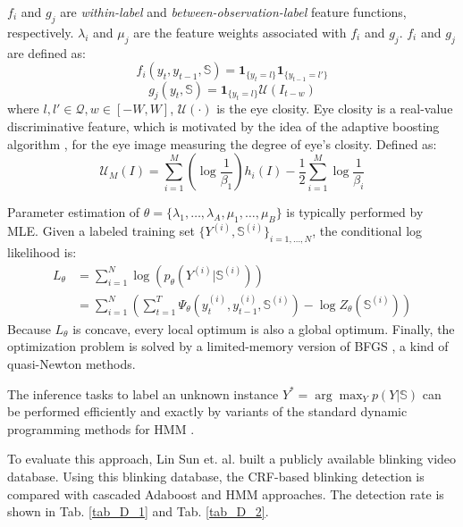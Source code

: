 \documentclass[journal]{IEEEtran}
\begin{document}
$f_i$ and $g_j$ are \textit{within-label} and \textit{between-observation-label} feature functions, respectively. $\lambda_i$ and $\mu_j$ are the feature weights associated with $f_i$ and $g_j$. $f_i$ and $g_j$ are defined as:
\begin{equation}
\label{eq_D_4}
f_i(y_t,y_{t-1},\mathbb{S}) = \mathbf{1}_{\{y_t=l\}} \mathbf{1}_{\{y_{t-1}=l'\}}
\end{equation}
\begin{equation}
\label{eq_D_5}
g_j(y_t,\mathbb{S}) = \mathbf{1}_{\{y_t=l\}} \mathcal{U}(I_{t-w})
\end{equation}
where $l, l' \in \mathcal{Q}, w\in[-W,W]$, $\mathcal{U}(\cdot)$ is the eye closity. Eye closity is a real-value discriminative feature, which is motivated by the idea of the adaptive boosting algorithm \cite{freund1997decision}, for the eye image measuring the degree of eye's closity. Defined as:
\begin{equation}
\label{eq_D_6}
\mathcal{U}_M(I) = \sum_{i=1}^M (\log \frac{1}{\beta_1}) h_i(I) - \frac{1}{2} \sum_{i=1}^M \log \frac{1}{\beta_i}
\end{equation}

Parameter estimation of $\theta=\{\lambda_1,\dots,\lambda_A,\mu_1,\dots,\mu_B\}$ is typically performed by MLE. Given a labeled training set $\{Y^{(i)}, \mathbb{S}^{(i)}\}_{i=1,\dots,N}$, the conditional log likelihood is:
\begin{equation}
\label{eq_D_7}
\begin{aligned}
L_\theta &= \sum_{i=1}^N \log (p_\theta(Y^{(i)}|\mathbb{S}^{(i)})) \\
&= \sum_{i=1}^N (\sum_{t=1}^T \Psi_\theta(y_t^{(i)},y_{t-1}^{(i)},\mathbb{S}^{(i)}) - \log Z_\theta(\mathbb{S}^{(i)}))
\end{aligned}
\end{equation}
Because $L_\theta$ is concave, every local optimum is also a global optimum. Finally, the optimization problem is solved by a limited-memory version of BFGS \cite{sha2003shallow}, a kind of quasi-Newton methods.

The inference tasks to label an unknown instance $Y^* = \arg \max_Y p(Y|\mathbb{S})$ can be performed efficiently and exactly by variants of the standard dynamic programming methods for HMM \cite{rabiner1989tutorial}.

To evaluate this approach, Lin Sun et. al. \cite{pan2007eyeblink} built a publicly available blinking video database. Using this blinking database, the CRF-based blinking detection is compared with cascaded Adaboost and HMM approaches. The detection rate is shown in Tab. \ref{tab_D_1} and Tab. \ref{tab_D_2}.
\end{document}
